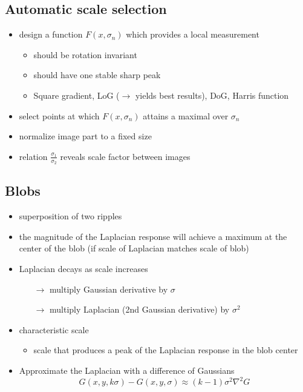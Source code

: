 \documentclass[12pt]{article}
\begin{document}
	\subsection{Automatic scale selection}
	\begin{itemize}
		\item design a function $F(x, \sigma_n)$ which provides a local measurement
			\begin{itemize}
				\item should be rotation invariant
				\item should have one stable sharp peak
				\item Square gradient, LoG ($\rightarrow$ yields best results), DoG, Harris function
			\end{itemize}
		\item select points at which $F(x, \sigma_n)$ attains a maximal over $\sigma_n$
		\item normalize image part to a fixed size
		\item relation $\frac{\sigma_1}{\sigma_2}$ reveals scale factor between images
	\end{itemize}
	
	\subsection{Blobs}
	\begin{itemize}
		\item superposition of two ripples
		\item the magnitude of the Laplacian response will achieve a maximum at the center of the blob (if scale of Laplacian matches scale of blob)
		\item Laplacian decays as scale increases
			\begin{itemize}
				\item[$\rightarrow$] multiply Gaussian derivative by $\sigma$
				\item[$\rightarrow$] multiply Laplacian (2nd Gaussian derivative) by $\sigma^2$
			\end{itemize}
		\item characteristic scale
			\begin{itemize}
				\item scale that produces a peak of the Laplacian response in the blob center
			\end{itemize}
		\item Approximate the Laplacian with a difference of Gaussians
			\begin{equation}
				G(x,y,k\sigma) - G(x,y,\sigma) \approx (k-1)\sigma^2\nabla^2G
			\end{equation}
	\end{itemize}
\end{document}
